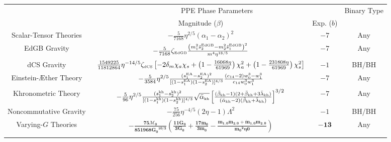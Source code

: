 \documentclass[prd,twocolumn,nofootinbib]{revtex4-1}
\newcommand{\EDGB}{{\mbox{\tiny EdGB}}}
\newcommand{\KG}{{\mbox{\tiny kh}}}
\newcommand{\EA}{{\mbox{\tiny EA}}}
\newcommand{\DCS}{{\mbox{\tiny dCS}}}
\begin{document}
{
\newcommand{\minitab}[2][l]{\begin{tabular}{#1}#2\end{tabular}}
\renewcommand{\arraystretch}{2.}
\begingroup 
\begin{table*}[htb]
\begin{centering}
\begin{tabular}{c|c|c|c}
\hline
\hline
\noalign{\smallskip}
\multirow{2}{*}{Theories}&\multicolumn{2}{c|}{PPE Phase Parameters} & \multirow{2}{*}{Binary Type}\\ \cline{2-3}
& Magnitude ($\beta$)   & Exp. ($b$) &  \\ \hline
Scalar-Tensor Theories~\cite{Scharre:2001hn,Berti:2004bd}&$-\frac{5}{7168}\eta ^{2/5}(\alpha_1-\alpha_2)^2$& $-7$ & Any\\ \hline
EdGB Gravity~\cite{Yagi:2011xp}&$-\frac{5}{7168}\zeta_\EDGB\frac{\left(m_1^2\tilde s_2^\EDGB-m_2^2\tilde s_1^\EDGB\right)^2}{m^4\eta^{18/5}}$&$-7$ & Any\\ \hline
dCS Gravity~\cite{Yagi:2012vf,Yunes:2016jcc}&$\frac{1549225}{11812864}\eta ^{-14/5} \zeta_{\DCS} \left[-2 \delta_m \chi_a \chi_s+\left(1-\frac{16068 \eta }{61969}\right)\chi_a^2 +\left(1-\frac{231808 \eta }{61969}\right)\chi_s^2\right]
$&$-1$ & BH/BH\\ \hline
Einstein-\AE ther Theory~\cite{Hansen:2014ewa}& $-\frac{5}{3584}\eta ^{2/5} \frac{(s_1^\EA-s_2^\EA)^2}{[(1-s_1^\EA) (1-s_2^\EA)]^{4/3}} \frac{(c_{14}-2) w_0^3-w_1^3}{c_{14} w_0^3 w_1^3}$  & $-7$ & Any\\ \hline
Khronometric Theory~\cite{Hansen:2014ewa}&$-\frac{5}{96} \eta ^{2/5}\frac{(s_1^\KG-s_2^\KG)^2}{[(1-s_1^\KG) (1-s_2^\KG)]^{4/3}}  \sqrt{\bar \alpha_{\KG}}\left[\frac{(\bar \beta_{\KG}-1)(2+\bar \beta_{\KG}+3\bar \lambda_{\KG})}{(\bar \alpha_{\KG}-2)(\bar \beta_{\KG}+\bar \lambda_{\KG})}\right]^{3/2}$&$-7$ & Any\\ \hline 
Noncommutative Gravity~\cite{Kobakhidze:2016cqh}& $-\frac{75}{256}\eta ^{-4/5}(2 \eta -1) \Lambda ^2$ &$-1$ &  BH/BH\\ \hline
Varying-$G$ Theories~\cite{Yunes:2009bv}&$\mathbf{-\frac{75 \mathcal{M}_0}{851968 {G_0}^{10/3}}\left(\frac{11 \dot{G}_0}{3 G_0}+ \frac{17 \dot{m}_0}{3m_0}- \frac{m_{1,0}\dot{m}_{2,0}+\dot{m}_{1,0}m_{2,0}}{{m_0}^2 \eta0}\right)}$&$ \mathbf{-13}$ & Any\\ 
\noalign{\smallskip}
\hline
\hline
\end{tabular}

\end{centering}
\end{table*}}
\end{document}
